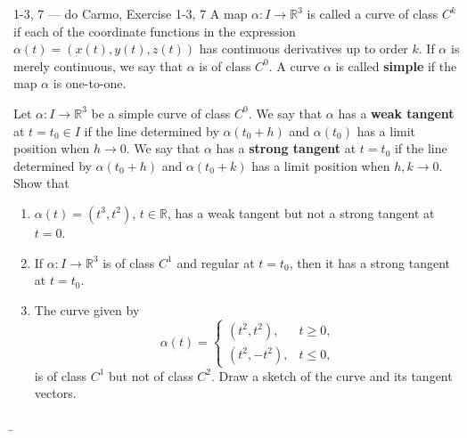 \begin{exercise}{1-3, 7 — do Carmo, Exercise 1-3, 7}
A map $\alpha: I \to \mathbb{R}^3$ is called a curve of class $C^k$ if each of the coordinate functions in the expression $\alpha(t) = (x(t), y(t), z(t))$ has continuous derivatives up to order $k$. If $\alpha$ is merely continuous, we say that $\alpha$ is of class $C^0$. A curve $\alpha$ is called \textbf{simple} if the map $\alpha$ is one-to-one.

Let $\alpha: I \to \mathbb{R}^3$ be a simple curve of class $C^0$. We say that $\alpha$ has a \textbf{weak tangent} at $t = t_0 \in I$ if the line determined by $\alpha(t_0 + h)$ and $\alpha(t_0)$ has a limit position when $h \to 0$. We say that $\alpha$ has a \textbf{strong tangent} at $t = t_0$ if the line determined by $\alpha(t_0 + h)$ and $\alpha(t_0 + k)$ has a limit position when $h, k \to 0$. Show that
\begin{enumerate}
\item[a.] $\alpha(t) = (t^3, t^2)$, $t \in \mathbb{R}$, has a weak tangent but not a strong tangent at $t = 0$.
\item[b.] If $\alpha: I \to \mathbb{R}^3$ is of class $C^1$ and regular at $t = t_0$, then it has a strong tangent at $t = t_0$.
\item[c.] The curve given by
\[
\alpha(t) = \begin{cases} (t^2, t^2), & t \geq 0, \\ (t^2, -t^2), & t \leq 0, \end{cases}
\]
is of class $C^1$ but not of class $C^2$. Draw a sketch of the curve and its tangent vectors.
\end{enumerate}
\end{exercise}

\b

